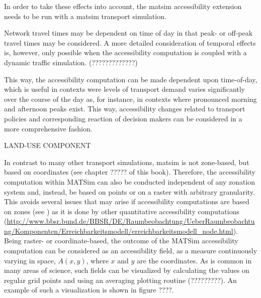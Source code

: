 
In order to take these effects into account, the \gls{matsim} accessibility extension 
needs to be run with a \gls{matsim} transport simulation.


Network travel times may be dependent on time of day in that \eg peak- or off-peak travel times may be 
considered. A more detailed consideration of temporal effects is, however, only possible when the accessibility 
computation is coupled with a dynamic traffic simulation. (?????????????)

This way, the accessibility computation can be made dependent upon time-of-day, which is useful in contexts were 
levels of transport demand varies significantly over the course of the day as, for instance, in contexts where 
pronounced morning and afternoon peaks exist. This way, accessibility changes related to transport policies and 
corresponding reaction of decision makers can be considered in a more comprehensive fashion.



LAND-USE COMPONENT

In contrast to many other transport simulations, \gls{matsim} is not zone-based, but based on coordinates (see 
chapter ????? of this book). Therefore, the accessibility computation within MATSim can also be conducted independent 
of any zonation system and, instead, be based on points or on a raster with arbitrary granularity. This avoids 
several issues that may arise if accessibility computations are based on zones 
(see \citep[e.g.,][]{NicolaiNagel2012HiResAccessibilityMethodInBook}) 
as it is done by other quantitative 
accessibility computations 
%
%
(\url{http://www.bbsr.bund.de/BBSR/DE/Raumbeobachtung/UeberRaumbeobachtung/Komponenten/Erreichbarkeitsmodell/erreichbarkeitsmodell_node.html}). Being raster- or coordinate-based, the outcome of the MATSim accessibility computation can be considered as 
an accessibility field,
\ie as a measure continuously varying in space, $A(x,y)$, where $x$ and $y$
are the coordinates. As is common in many areas of science, such
fields can be visualized by calculating the values on regular grid
points and using an averaging plotting routine (?????????). An example of such a visualization is shown in figure ????.

